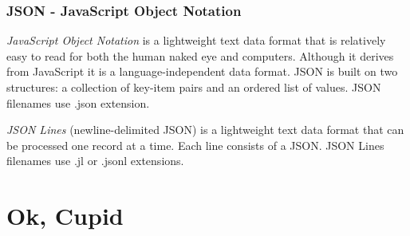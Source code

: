 \documentclass[aspectratio=169]{beamer}
\begin{document}
\begin{frame}
    \frametitle{JSON - JavaScript Object Notation}
    \begin{definition}
        \emph{JavaScript Object Notation} is a lightweight text data format that is relatively easy to read for both the human naked eye and computers. Although it derives from JavaScript it is a language-independent data format. JSON is built on two structures: a collection of key-item pairs and an ordered list of values. JSON filenames use .json extension.
    \end{definition}
\begin{definition}
    \emph{JSON Lines} (newline-delimited JSON) is a lightweight text data format that can be processed one record at a time. Each line consists of a JSON. JSON Lines filenames use .jl or .jsonl extensions.
\end{definition}
\end{frame}

\section[Dating]{Ok, Cupid}
\end{document}
